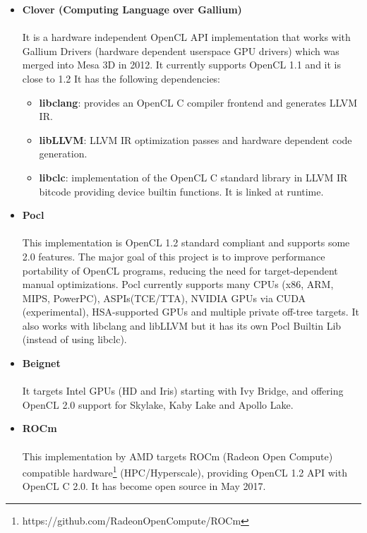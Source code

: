 \documentclass[12pt,a4paper,oneside]{article}
\begin{document}
\begin{itemize}
  \item \textbf{Clover (Computing Language over Gallium)}\\\\
  It is a hardware independent OpenCL API implementation that works with Gallium
  Drivers (hardware dependent userspace GPU drivers) which was merged into Mesa 3D
  in 2012. It currently supports OpenCL 1.1 and it is close to 1.2 It has the
  following dependencies:
    \begin{itemize}
      \item \textbf{libclang}: provides an OpenCL C compiler frontend and generates LLVM IR.
      \item \textbf{libLLVM}: LLVM IR optimization passes and hardware dependent code
      generation.
      \item \textbf{libclc}: implementation of the OpenCL C standard library in LLVM IR
      bitcode providing device builtin functions. It is linked at runtime.
    \end{itemize}
  \item \textbf{Pocl}\\\\
  This implementation is OpenCL 1.2 standard compliant and supports some 2.0
  features. The major goal of this project is to improve performance portability
  of OpenCL programs, reducing the need for target-dependent manual optimizations.
  Pocl currently supports many CPUs (x86, ARM, MIPS, PowerPC), ASPIs(TCE/TTA),
  NVIDIA GPUs via CUDA (experimental), HSA-supported GPUs and multiple private
  off-tree targets. It also works with libclang and libLLVM but it has its own
  Pocl Builtin Lib (instead of using libclc).
  \item \textbf{Beignet}\\\\
  It targets Intel GPUs (HD and Iris) starting with Ivy Bridge, and offering
  OpenCL 2.0 support for Skylake, Kaby Lake and Apollo Lake.
  \item \textbf{ROCm}\\\\
  This implementation by AMD targets ROCm (Radeon Open Compute) compatible
  hardware\footnote{https://github.com/RadeonOpenCompute/ROCm} (HPC/Hyperscale),
  providing OpenCL 1.2 API with OpenCL C 2.0. It has become open source in May
  2017.
\end{itemize}
\end{document}

